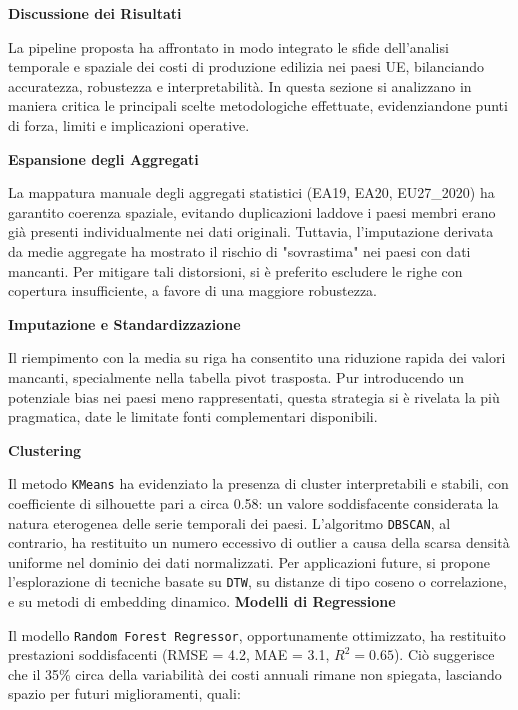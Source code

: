 \documentclass[conference]{IEEEtran}
\begin{document}
{\vspace{1em}\noindent\textbf{Discussione dei Risultati}

La pipeline proposta ha affrontato in modo integrato le sfide dell’analisi temporale e spaziale dei costi di produzione edilizia nei paesi UE, bilanciando accuratezza, robustezza e interpretabilità. In questa sezione si analizzano in maniera critica le principali scelte metodologiche effettuate, evidenziandone punti di forza, limiti e implicazioni operative.

\vspace{1em}\noindent\textbf{Espansione degli Aggregati}

La mappatura manuale degli aggregati statistici (EA19, EA20, EU27\_2020) ha garantito coerenza spaziale, evitando duplicazioni laddove i paesi membri erano già presenti individualmente nei dati originali. Tuttavia, l’imputazione derivata da medie aggregate ha mostrato il rischio di "sovrastima" nei paesi con dati mancanti. Per mitigare tali distorsioni, si è preferito escludere le righe con copertura insufficiente, a favore di una maggiore robustezza.

\vspace{1em}\noindent\textbf{Imputazione e Standardizzazione}

Il riempimento con la media su riga ha consentito una riduzione rapida dei valori mancanti, specialmente nella tabella pivot trasposta. Pur introducendo un potenziale bias nei paesi meno rappresentati, questa strategia si è rivelata la più pragmatica, date le limitate fonti complementari disponibili.

\vspace{1em}\noindent\textbf{Clustering}

Il metodo \texttt{KMeans} ha evidenziato la presenza di cluster interpretabili e stabili, con coefficiente di silhouette pari a circa 0.58: un valore soddisfacente considerata la natura eterogenea delle serie temporali dei paesi. L’algoritmo \texttt{DBSCAN}, al contrario, ha restituito un numero eccessivo di outlier a causa della scarsa densità uniforme nel dominio dei dati normalizzati. Per applicazioni future, si propone l’esplorazione di tecniche basate su \texttt{DTW}, su distanze di tipo coseno o correlazione, e su metodi di embedding dinamico.
\newpage
\vspace{1em}\noindent\textbf{Modelli di Regressione}

Il modello \texttt{Random Forest Regressor}, opportunamente ottimizzato, ha restituito prestazioni soddisfacenti (RMSE = 4.2, MAE = 3.1, $R^2 = 0.65$). Ciò suggerisce che il 35\% circa della variabilità dei costi annuali rimane non spiegata, lasciando spazio per futuri miglioramenti, quali:

}
\end{document}
